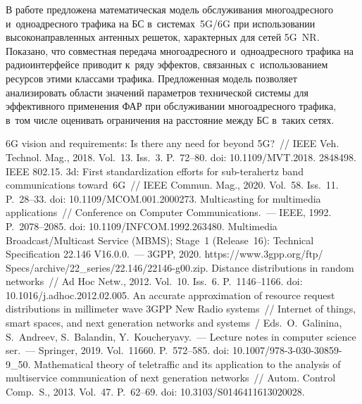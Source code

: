 \begin{multicols}{2}
  В работе предложена математическая модель обслуживания 
  многоадресного и~одноадресного трафика на БС в~сис\-те\-мах~5G/6G при использовании 
вы\-со\-ко\-на\-прав\-лен\-ных антенных решеток, характерных для сетей 5G~NR. 
Показано, что со\-вмест\-ная передача многоадресного и~одноадресного трафика 
на радиоинтерфейсе приводит к~ряду эффектов, связанных с~использованием 
ресурсов этими классами трафика. Предложенная модель поз\-во\-ля\-ет 
анализировать области значений па\-ра\-мет\-ров технической сис\-те\-мы для 
эффективного применения ФАР при обслуживании многоадресного трафика, 
в~том чис\-ле оценивать ограничения на рас\-сто\-яние между БС
в~таких сетях.
  
{\small\frenchspacing
 {\baselineskip=11.5pt
 \begin{thebibliography}{99}
 6G vision and requirements: Is there any need for beyond 5G?~// IEEE 
Veh. Technol. Mag., 2018. Vol.~13. Iss.~3. P.~72--80. doi: 10.1109/MVT.2018. 2848498.
 IEEE 802.15. 3d: First standardization efforts for  
sub-terahertz band communications toward~6G~// IEEE Commun. Mag., 2020. Vol.~58. Iss.~11. 
P.~28--33. doi: 10.1109/MCOM.001.2000273. 
 Multicasting for multimedia applications~// 
Conference on Computer Communications.~--- IEEE, 1992. P.~2078--2085. doi: 
10.1109/INFCOM.1992.263480. 
Multimedia Broadcast/Multicast Service (MBMS); Stage~1 (Release~16): Technical Specification 
22.146 V16.0.0.~--- 3GPP, 2020. {\sf  
https://www.3gpp.org/ftp/ Specs/archive/22\_series/22.146/22146-g00.zip}.
 Distance distributions in random networks~// Ad Hoc Netw., 2012. 
Vol.~10. Iss.~6. P.~1146--1166. doi: 10.1016/j.adhoc.2012.02.005.
 An accurate approximation 
of resource request distributions in millimeter wave 3GPP New Radio systems~// Internet of 
things, smart spaces, and next generation networks and systems~/
Eds.\ O.~Galinina, S.~Andreev, S.~Balandin, Y.~Koucheryavy.~--- Lecture notes in computer science ser.~--- 
Springer, 2019. Vol.~11660. P.~572--585. doi: 10.1007/978-3-030-30859-9\_50.
 Mathematical theory of teletraffic and its 
application to the analysis of multiservice communication of next generation networks~// Autom. 
Control Comp.~S., 2013. Vol.~47. P.~62--69. doi:  10.3103/S0146411613020028.


\end{thebibliography}}}
\end{multicols}
